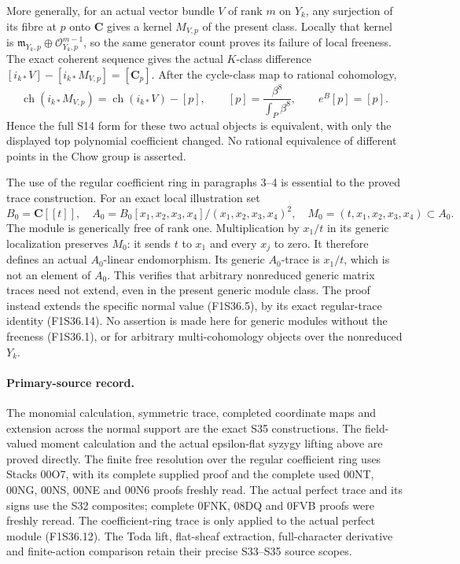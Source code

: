More generally, for an actual vector bundle
$V$ of rank $m$ on $Y_k$, any surjection of
its fibre at $p$ onto $\mathbf C$ gives a
kernel $M_{V,p}$ of the present class.
Locally that kernel is
$\mathfrak m_{Y_k,p}\oplus\mathcal O_{Y_k,p}^{m-1}$,
so the same generator count proves its
failure of local freeness.
The exact coherent sequence gives the actual
$K$-class difference $[i_{k*}V]-[i_{k*}M_{V,p}]
=[\mathbf C_p]$.
After the cycle-class map to rational cohomology,
\[
 \operatorname{ch}(i_{k*}M_{V,p})
     =\operatorname{ch}(i_{k*}V)-[p],\qquad
 [p]=\frac{\beta^8}{\int_P\beta^8},\qquad e^B[p]=[p].
 \tag{F1S36.24}
\]
Hence the full S14 form for these two actual
objects is equivalent, with only the displayed
top polynomial coefficient changed.
No rational equivalence of different points
in the Chow group is asserted.

The use of the regular coefficient ring in
paragraphs 3--4 is essential to the proved
trace construction. For an exact local
illustration set
\[
 B_0=\mathbf C[[t]],\quad
 A_0=B_0[x_1,x_2,x_3,x_4]/(x_1,x_2,x_3,x_4)^2,
 \quad M_0=(t,x_1,x_2,x_3,x_4)\subset A_0.
 \tag{F1S36.25}
\]
The module is generically free of rank one.
Multiplication by $x_1/t$ in its generic
localization preserves $M_0$: it sends $t$
to $x_1$ and every $x_j$ to zero.
It therefore defines an actual $A_0$-linear
endomorphism. Its generic $A_0$-trace is
$x_1/t$, which is not an element of $A_0$.
This verifies that arbitrary nonreduced
generic matrix traces need not extend, even
in the present generic module class.
The proof instead extends the specific
normal value (F1S36.5), by its exact
regular-trace identity (F1S36.14).
No assertion is made here for generic
modules without the freeness (F1S36.1),
or for arbitrary multi-cohomology objects
over the nonreduced $Y_k$.

\paragraph{Primary-source record.}
The monomial calculation, symmetric trace,
completed coordinate maps and extension
across the normal support are the exact
S35 constructions. The field-valued moment
calculation and the actual epsilon-flat
syzygy lifting above are proved directly.
The finite free resolution over the regular
coefficient ring uses Stacks 00O7, with its
complete supplied proof and the complete
used 00NT, 00NG, 00NS, 00NE and 00N6
proofs freshly read.
The actual perfect trace and its signs use
the S32 composites; complete 0FNK, 08DQ
and 0FVB proofs were freshly reread.
The coefficient-ring trace is only applied
to the actual perfect module (F1S36.12).
The Toda lift, flat-sheaf extraction,
full-character derivative and finite-action
comparison retain their precise S33--S35
source scopes.
